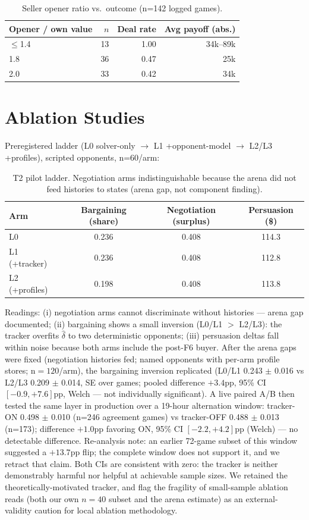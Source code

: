 \documentclass[11pt]{article}
\begin{document}
\begin{table}[t]\centering\small
\caption{Seller opener ratio vs.\ outcome (n=142 logged games).}
\label{tab:openers}
\begin{tabular}{lrrr}
\toprule
Opener / own value & $n$ & Deal rate & Avg payoff (abs.) \\
\midrule
$\le$1.4 & 13 & 1.00 & 34k--89k \\
1.8 & 36 & 0.47 & 25k \\
2.0 & 33 & 0.42 & 34k \\
\bottomrule
\end{tabular}
\end{table}

\section{Ablation Studies}
Preregistered ladder (L0 solver-only $\to$ L1 +opponent-model $\to$ L2/L3 +profiles), scripted opponents, n=60/arm:

\begin{table}[t]\centering\small
\caption{T2 pilot ladder. Negotiation arms indistinguishable because the arena did not feed histories to states (arena gap, not component finding).}
\label{tab:t2}
\begin{tabular}{lccc}
\toprule
Arm & Bargaining (share) & Negotiation (surplus) & Persuasion (\$) \\
\midrule
L0 & 0.236 & 0.408 & 114.3 \\
L1 (+tracker) & 0.236 & 0.408 & 112.8 \\
L2 (+profiles) & 0.198 & 0.408 & 113.8 \\
\bottomrule
\end{tabular}
\end{table}

Readings: (i) negotiation arms cannot discriminate without histories --- arena gap documented; (ii) bargaining shows a small inversion (L0/L1 $>$ L2/L3): the tracker overfits $\hat\delta$ to two deterministic opponents; (iii) persuasion deltas fall within noise because both arms include the post-F6 buyer. After the arena gaps were fixed (negotiation histories fed; named opponents with per-arm profile stores; n$=120$/arm), the bargaining inversion replicated (L0/L1 0.243 $\pm$ 0.016 vs L2/L3 0.209 $\pm$ 0.014, SE over games; pooled difference $+3.4$pp, 95\% CI $[-0.9, +7.6]$pp, Welch --- not individually significant). A live paired A/B then tested the same layer in production over a 19-hour alternation window: tracker-ON 0.498 $\pm$ 0.010 (n=246 agreement games) vs tracker-OFF 0.488 $\pm$ 0.013 (n=173); difference $+1.0$pp favoring ON, 95\% CI $[-2.2, +4.2]$pp (Welch) --- no detectable difference. Re-analysis note: an earlier 72-game subset of this window suggested a $+13.7$pp flip; the complete window does not support it, and we retract that claim. Both CIs are consistent with zero: the tracker is neither demonstrably harmful nor helpful at achievable sample sizes. We retained the theoretically-motivated tracker, and flag the fragility of small-sample ablation reads (both our own $n{=}40$ subset and the arena estimate) as an external-validity caution for local ablation methodology.
\end{document}
